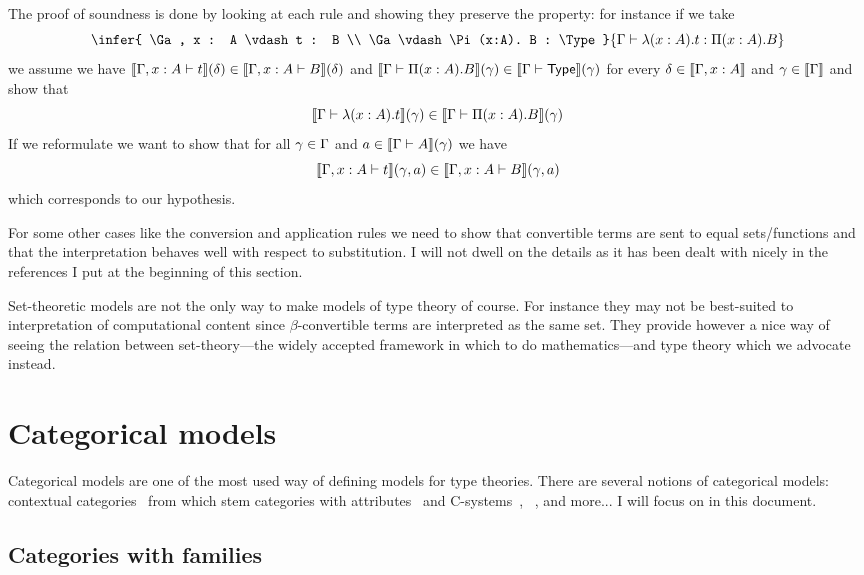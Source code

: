 The proof of soundness is done by looking at each rule and showing they preserve
the property: for instance if we take
\[
  \infer
    {
      \Ga, x : A \vdash t : B \\
      \Ga \vdash \Pi (x:A). B : \Type
    }
    {\Ga \vdash \lambda (x:A). t : \Pi (x:A). B}
\]
we assume we have
\(\llbracket \Gamma, x:A \vdash t \rrbracket(\delta) \in \llbracket \Gamma, x:A \vdash B \rrbracket(\delta)\)
and
\(\llbracket \Gamma \vdash \Pi (x:A). B \rrbracket(\gamma) \in \llbracket \Gamma \vdash \mathsf{Type} \rrbracket(\gamma)\)
for every \(\delta \in \llbracket \Gamma, x:A \rrbracket\) and \(\gamma \in \llbracket \Gamma \rrbracket\)
and show that
\[
  \llbracket \Gamma \vdash \lambda (x:A). t \rrbracket(\gamma) \in
  \llbracket \Gamma \vdash \Pi (x:A). B \rrbracket(\gamma)
\]
If we reformulate we want to show that for all \(\gamma \in \Gamma\) and
\(a \in \llbracket \Gamma \vdash A \rrbracket(\gamma)\) we have
\[
  \llbracket \Gamma, x : A \vdash t \rrbracket(\gamma, a) \in
  \llbracket \Gamma, x:A \vdash B \rrbracket(\gamma,a)
\]
which corresponds to our hypothesis.

For some other cases like the conversion and application rules we need to show
that convertible terms are sent to equal sets/functions and that the
interpretation behaves well with respect to substitution.
I will not dwell on the details as it has been dealt with nicely in the
references I put at the beginning of this section.

Set-theoretic models are not the only way to make models of type theory of
course. For instance they may not be best-suited to interpretation of
computational content since \(\beta\)-convertible terms are interpreted as the
same set. They provide however a nice way of seeing the relation between
set-theory---the widely accepted framework in which to do mathematics---and type
theory which we advocate
instead.

\section{Categorical models}

Categorical models are one of the most used way of defining models for type
theories. There are several notions of categorical models:
contextual categories~ from which stem
categories with attributes~ and
C-systems~,
~, and more...
I will focus on  in this document.

\subsection{Categories with families}

